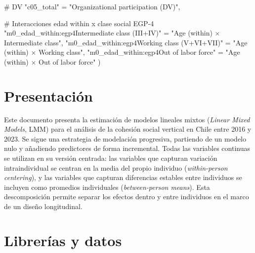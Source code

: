 \documentclass[
  spanish,
  a4paper,
  oneside]{scrbook}
\newenvironment{Shaded}{\begin{snugshade}}{\end{snugshade}}
\newcommand{\CommentTok}[1]{\textcolor[rgb]{0.37,0.37,0.37}{#1}}
\newcommand{\NormalTok}[1]{\textcolor[rgb]{0.00,0.23,0.31}{#1}}
\newcommand{\OtherTok}[1]{\textcolor[rgb]{0.00,0.23,0.31}{#1}}
\newcommand{\StringTok}[1]{\textcolor[rgb]{0.13,0.47,0.30}{#1}}
\begin{document}
\begin{Shaded}
\begin{Highlighting}[]
  \CommentTok{\# DV}
  \StringTok{"c05\_total"} \OtherTok{=} \StringTok{"Organizational participation (DV)"}\NormalTok{,}

  \CommentTok{\# Interacciones edad within x clase social EGP{-}4}
  \StringTok{"m0\_edad\_within:egp4Intermediate class (III+IV)"}    \OtherTok{=} \StringTok{"Age (within) × Intermediate class"}\NormalTok{,}
  \StringTok{"m0\_edad\_within:egp4Working class (V+VI+VII)"}       \OtherTok{=} \StringTok{"Age (within) × Working class"}\NormalTok{,}
  \StringTok{"m0\_edad\_within:egp4Out of labor force"}             \OtherTok{=} \StringTok{"Age (within) × Out of labor force"}
\NormalTok{) }
\end{Highlighting}
\end{Shaded}

\chapter{Presentación}\label{presentaciuxf3n-2}

Este documento presenta la estimación de modelos lineales mixtos
(\emph{Linear Mixed Models}, LMM) para el análisis de la cohesión social
vertical en Chile entre 2016 y 2023. Se sigue una estrategia de
modelación progresiva, partiendo de un modelo nulo y añadiendo
predictores de forma incremental. Todas las variables continuas se
utilizan en su versión centrada: las variables que capturan variación
intraindividual se centran en la media del propio individuo
(\emph{within-person centering}), y las variables que capturan
diferencias estables entre individuos se incluyen como promedios
individuales (\emph{between-person means}). Esta descomposición permite
separar los efectos dentro y entre individuos en el marco de un diseño
longitudinal.

\chapter{Librerías y datos}\label{libreruxedas-y-datos-1}
\end{document}
